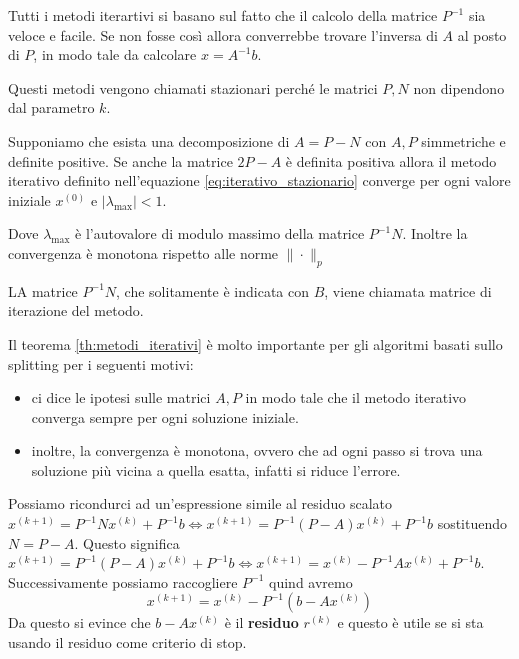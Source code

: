 Tutti i metodi iterartivi si basano sul fatto che il calcolo della matrice $P^{-1}$ 
sia veloce e facile. Se non fosse così allora converrebbe trovare l'inversa di 
$A$ al posto di $P$, in modo tale da calcolare $x=A^{-1}b$.

Questi metodi vengono chiamati stazionari perché le matrici $P,N$ non dipendono 
dal parametro $k$.

\begin{teorema}
    \label{th:metodi_iterativi}
    Supponiamo che esista una decomposizione di $A=P-N $ con $A, P$ simmetriche 
    e definite positive. Se anche la matrice $2P-A$ è definita positiva allora 
    il metodo iterativo definito nell'equazione \ref{eq:iterativo_stazionario} 
    converge per ogni valore iniziale $x^{(0)}$ e $|\lambda_{\max}| < 1$.

    Dove $\lambda_{\max}$ è l'autovalore di modulo massimo della matrice $P^{-1}N$.
    Inoltre la convergenza è monotona rispetto alle norme $\|\cdot\|_p$
\end{teorema}

\begin{definizione}
    LA matrice $P^{-1}N$, che solitamente è indicata con $B$, viene chiamata matrice 
    di iterazione del metodo.
\end{definizione}

Il teorema \ref{th:metodi_iterativi} è molto importante per gli algoritmi basati 
sullo splitting per i seguenti motivi:
\begin{itemize}
    \item ci dice le ipotesi sulle matrici $A, P$ in modo tale che il metodo iterativo
    converga sempre per ogni soluzione iniziale.
    \item inoltre, la convergenza è monotona, ovvero che ad ogni passo si trova 
    una soluzione più vicina a quella esatta, infatti si riduce l'errore.
\end{itemize}

Possiamo ricondurci ad un'espressione simile al residuo scalato
$ x^{(k+1)}= P^{-1}Nx^{(k)}+P^{-1}b \iff x^{(k+1)} = P^{-1}(P-A)x^{(k)}+P^{-1}b$
sostituendo $N=P-A$. Questo significa $ x^{(k+1)} = P^{-1}(P-A)x^{(k)}+P^{-1}b\iff  
x^{(k+1)} = x^{(k)}-P^{-1}Ax^{(k)}+P^{-1}b$. Successivamente possiamo
raccogliere $P^{-1}$ quind avremo
$$x^{(k+1)} = x^{(k)}-P^{-1}(b-Ax^{(k)})$$
Da questo si evince che $b-Ax^{(k)}$ è il \textbf{residuo} $r^{(k)}$ e questo è 
utile se si sta usando il residuo come criterio di stop.

